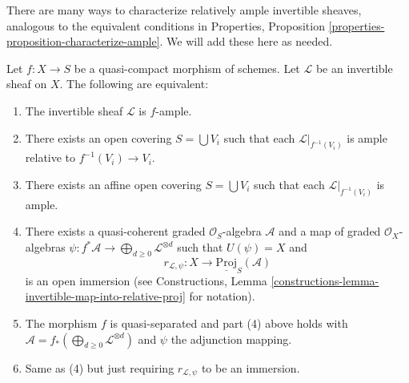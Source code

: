 \noindent
There are many ways to characterize relatively ample invertible
sheaves, analogous to the equivalent conditions in
Properties, Proposition \ref{properties-proposition-characterize-ample}.
We will add these here as needed.

\begin{lemma}
\label{lemma-characterize-relatively-ample}
\begin{reference}
\cite[II, Proposition 4.6.3]{EGA}
\end{reference}
Let $f : X \to S$ be a quasi-compact morphism of schemes.
Let $\mathcal{L}$ be an invertible sheaf on $X$.
The following are equivalent:
\begin{enumerate}
\item The invertible sheaf $\mathcal{L}$ is $f$-ample.
\item There exists an open covering $S = \bigcup V_i$
such that each $\mathcal{L}|_{f^{-1}(V_i)}$ is ample
relative to $f^{-1}(V_i) \to V_i$.
\item There exists an affine open covering $S = \bigcup V_i$
such that each $\mathcal{L}|_{f^{-1}(V_i)}$ is ample.
\item There exists a quasi-coherent graded $\mathcal{O}_S$-algebra
$\mathcal{A}$ and a map of graded $\mathcal{O}_X$-algebras
$\psi : f^*\mathcal{A} \to \bigoplus_{d \geq 0} \mathcal{L}^{\otimes d}$
such that $U(\psi) = X$ and
$$
r_{\mathcal{L}, \psi} :
X
\longrightarrow
\underline{\text{Proj}}_S(\mathcal{A})
$$
is an open immersion (see Constructions, Lemma
\ref{constructions-lemma-invertible-map-into-relative-proj} for notation).
\item The morphism $f$ is quasi-separated and
part (4) above holds with
$\mathcal{A} = f_*(\bigoplus_{d \geq 0} \mathcal{L}^{\otimes d})$
and $\psi$ the adjunction mapping.
\item Same as (4) but just requiring $r_{\mathcal{L}, \psi}$
to be an immersion.
\end{enumerate}
\end{lemma}

